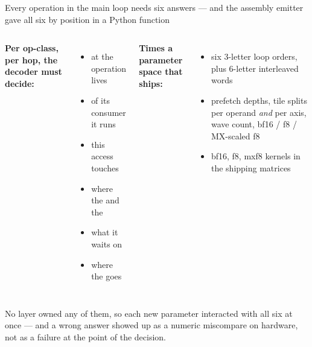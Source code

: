 \begin{frame}{Every operation in the main loop needs six answers --- and the assembly emitter gave all six by position in a Python function}

\begin{center}
\end{center}

\begin{columns}[T]
{\scriptsize \textbf{Per op-class, per hop, the decoder must decide:}}
\begin{itemize}\scriptsize
  \item at  the operation lives
  \item {} of its consumer it runs 
  \item {} this access touches
  \item where the  and the 
  \item what  it waits on
  \item where the  goes
\end{itemize}

{\scriptsize \textbf{Times a parameter space that ships:}}
\begin{itemize}\scriptsize
  \item six 3-letter loop orders, plus 6-letter interleaved words 
  \item prefetch depths, tile splits per operand \emph{and} per axis, wave count, bf16 / f8 / MX-scaled f8
  \item {} bf16,  f8,  mxf8 kernels in the shipping matrices
\end{itemize}
\end{columns}

\vspace{2mm}
{\scriptsize {} No layer
owned any of them, so each new parameter interacted with all six at once --- and a wrong answer showed
up as a numeric miscompare on hardware, not as a failure at the point of the decision.}

\end{frame}
